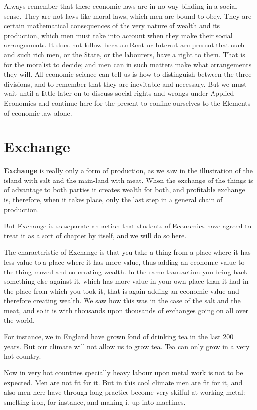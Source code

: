 \documentclass{book}
\begin{document}
Always remember that these economic laws are in no way binding in a social sense. They are not laws like moral laws, which men are bound to obey. They are certain mathematical consequences of the very nature of wealth and its production, which men must take into account when they make their social arrangements. It does not follow because Rent or Interest are present that such and such rich men, or the State, or the labourers, have a right to them. That is for the moralist to decide; and men can in such matters make what arrangements they will. All economic science can tell us is how to distinguish between the three divisions, and to remember that they are inevitable and necessary. But we must wait until a little later on to discuss social rights and wrongs under Applied Economics and continue here for the present to confine ourselves to the Elements of economic law alone.

\chapter{Exchange}
\label{chapter-5}
\textbf{Exchange} is really only a form of production, as we saw in the illustration of the island with salt and the main-land with meat. When the exchange of the things is of advantage to both parties it creates wealth for both, and profitable exchange is, therefore, when it takes place, only the last step in a general chain of production.

But Exchange is so separate an action that students of Economics have agreed to treat it as a sort of chapter by itself, and we will do so here.

The characteristic of Exchange is that you take a thing from a place where it has less value to a place where it has more value, thus adding an economic value to the thing moved and so creating wealth. In the same transaction you bring back something else against it, which has more value in your own place than it had in the place from which you took it, that is again adding an economic value and therefore creating wealth. We saw how this was in the case of the salt and the meat, and so it is with thousands upon thousands of exchanges going on all over the world.

For instance, we in England have grown fond of drinking tea in the last 200 years. But our climate will not allow us to grow tea. Tea can only grow in a very hot country.

Now in very hot countries specially heavy labour upon metal work is not to be expected. Men are not fit for it. But in this cool climate men are fit for it, and also men here have through long practice become very skilful at working metal: smelting iron, for instance, and making it up into machines.
\end{document}
